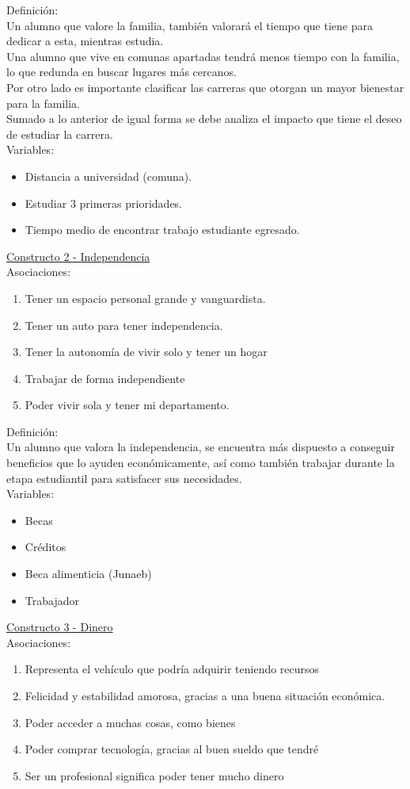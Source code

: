 Definición:\\
Un alumno que valore la familia, también valorará el tiempo que tiene para dedicar a esta, mientras estudia.\\
Una alumno que vive en comunas apartadas tendrá menos tiempo con la familia, lo que redunda en buscar lugares más cercanos.\\
Por otro lado es importante clasificar las carreras que otorgan un mayor bienestar para la familia.\\
Sumado a lo anterior de igual forma se debe analiza el impacto que tiene el deseo de estudiar la carrera.\\

Variables:
\begin{itemize}
	\item Distancia a universidad (comuna).
	\item Estudiar 3 primeras prioridades.
	\item Tiempo medio de encontrar trabajo estudiante egresado.
\end{itemize}


\underline {Constructo 2 - Independencia}\\ 
Asociaciones:
\begin{enumerate}
	\item Tener un espacio personal grande y vanguardista.
	\item Tener un auto para tener independencia.
	\item Tener la autonomía de vivir solo y tener un hogar
	\item Trabajar de forma independiente
	\item Poder vivir sola y tener mi departamento.	
\end{enumerate}

Definición:\\
Un alumno que valora la independencia, se encuentra más dispuesto a conseguir beneficios que lo ayuden económicamente, así como también trabajar durante la etapa estudiantil para satisfacer sus necesidades.\\

Variables:
\begin{itemize}
	\item Becas
	\item Créditos
	\item Beca alimenticia (Junaeb)
	\item Trabajador
\end{itemize}

\underline {Constructo 3 - Dinero}\\ 
Asociaciones:
\begin{enumerate}
	\item Representa el vehículo que podría adquirir teniendo recursos
	\item Felicidad y estabilidad amorosa, gracias a una buena situación económica.
	\item Poder acceder a muchas cosas, como bienes
	\item Poder comprar tecnología, gracias al buen sueldo que tendré
	\item Ser un profesional significa poder tener mucho dinero
\end{enumerate}

